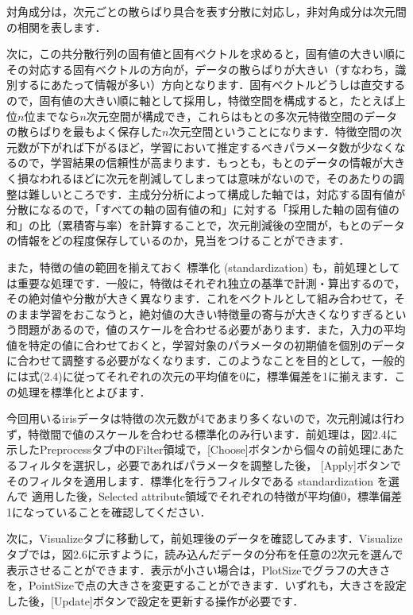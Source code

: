 
対角成分は，次元ごとの散らばり具合を表す分散に対応し，非対角成分は次元間の相関を表します．

次に，この共分散行列の固有値と固有ベクトルを求めると，固有値の大きい順にその対応する固有ベクトルの方向が，データの散らばりが大きい（すなわち，識別するにあたって情報が多い）方向となります．固有ベクトルどうしは直交するので，固有値の大きい順に軸として採用し，特徴空間を構成すると，たとえば上位$n$位までなら$n$次元空間が構成でき，これらはもとの多次元特徴空間のデータの散らばりを最もよく保存した$n$次元空間ということになります．特徴空間の次元数が下がれば下がるほど，学習において推定するべきパラメータ数が少なくなるので，学習結果の信頼性が高まります．もっとも，もとのデータの情報が大きく損なわれるほどに次元を削減してしまっては意味がないので，そのあたりの調整は難しいところです．主成分分析によって構成した軸では，対応する固有値が分散になるので，「すべての軸の固有値の和」に対する「採用した軸の固有値の和」の比（累積寄与率）を計算することで，次元削減後の空間が，もとのデータの情報をどの程度保存しているのか，見当をつけることができます．


また，特徴の値の範囲を揃えておく
標準化 (standardization)
も，前処理としては重要な処理です．一般に，特徴はそれぞれ独立の基準で計測・算出するので，その絶対値や分散が大きく異なります．これをベクトルとして組み合わせて，そのまま学習をおこなうと，絶対値の大きい特徴量の寄与が大きくなりすぎるという問題があるので，値のスケールを合わせる必要があります．また，入力の平均値を特定の値に合わせておくと，学習対象のパラメータの初期値を個別のデータに合わせて調整する必要がなくなります．このようなことを目的として，一般的には式(2.4)に従ってそれぞれの次元の平均値を0に，標準偏差を1に揃えます．この処理を標準化とよびます．



今回用いるirisデータは特徴の次元数が4であまり多くないので，次元削減は行わず，特徴間で値のスケールを合わせる標準化のみ行います．前処理は，図2.4に示したPreprocessタブ中のFilter領域で，[Choose]ボタンから個々の前処理にあたるフィルタを選択し，必要であればパラメータを調整した後，
[Apply]ボタンでそのフィルタを適用します．標準化を行うフィルタである standardization を選んで
適用した後，Selected attribute領域でそれぞれの特徴が平均値0，標準偏差1になっていることを確認してください．

次に，Visualizeタブに移動して，前処理後のデータを確認してみます．Visualizeタブでは，図2.6に示すように，読み込んだデータの分布を任意の2次元を選んで表示させることができます．表示が小さい場合は，PlotSizeでグラフの大きさを，PointSizeで点の大きさを変更することができます．いずれも，大きさを設定した後，[Update]ボタンで設定を更新する操作が必要です．

